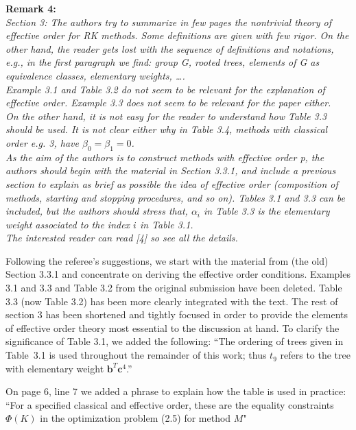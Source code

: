 \documentclass[12pt]{article}
\newcommand{\remark}[2]{\vspace{25pt} \noindent \textbf{Remark #1:\newline} \textit{#2}\vspace{15pt}}
\renewcommand{\newline}{\vspace{15pt}\\}
\begin{document}
\remark{4}{
Section 3: The authors try to summarize in few pages the nontrivial theory of effective
order for RK methods. 
Some definitions are given with few rigor. 
On the other hand, the reader gets lost with the sequence of definitions and notations, 
e.g., in the first paragraph we find: group G, rooted trees, elements of G as equivalence 
classes, elementary weights, \dots.
\newline
Example 3.1 and Table 3.2 do not seem to be relevant for the explanation of effective
order. 
Example 3.3 does not seem to be relevant for the paper either.
\newline
On the other hand, it is not easy for the reader to understand how Table 3.3 should be
used. It is not clear either why in Table 3.4, methods with classical order e.g. 3, have
$\beta_0 = \beta_1 = 0$. \\
As the aim of the authors is to construct methods with effective order p, the authors
should begin with the material in Section 3.3.1, and include a previous section to explain
as brief as possible the idea of effective order (composition of methods, starting and
stopping procedures, and so on).
Tables 3.1 and 3.3 can be included, but the authors should stress that, $\alpha_i$ in 
Table 3.3 is the elementary weight associated to the index $i$ in Table 3.1.
\newline
The interested reader can read [4] so see all the details.}

Following the referee's suggestions, we start with the material from (the old) Section 3.3.1 and concentrate on deriving the effective order conditions.
Examples 3.1 and 3.3 and Table 3.2 from the original submission have been deleted.
Table 3.3 (now Table 3.2) has been more clearly integrated with the text.
The rest of section 3 has been shortened and tightly focused in order to provide the elements
of effective order theory most essential to the discussion at hand.
To clarify the significance of Table 3.1, we added the following:
``The ordering of trees given in Table~3.1 is used
throughout the remainder of this work; thus $t_9$ refers to the tree with
elementary weight $\bm{b}^T \bm{c}^4$.''

On page 6, line 7 we added a phrase to explain how the table is used in practice:
``For a specified classical and effective order, these are the equality constraints
$\Phi(K)$ in the optimization problem (2.5) for method $M$"
\end{document}

